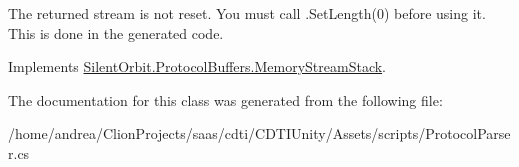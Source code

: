 The returned stream is not reset. You must call .Set\+Length(0) before using it. This is done in the generated code. 



Implements \hyperlink{interface_silent_orbit_1_1_protocol_buffers_1_1_memory_stream_stack}{Silent\+Orbit.\+Protocol\+Buffers.\+Memory\+Stream\+Stack}.



The documentation for this class was generated from the following file\+:\begin{DoxyCompactItemize}
\item 
/home/andrea/\+Clion\+Projects/saas/cdti/\+C\+D\+T\+I\+Unity/\+Assets/scripts/Protocol\+Parser.\+cs\end{DoxyCompactItemize}
